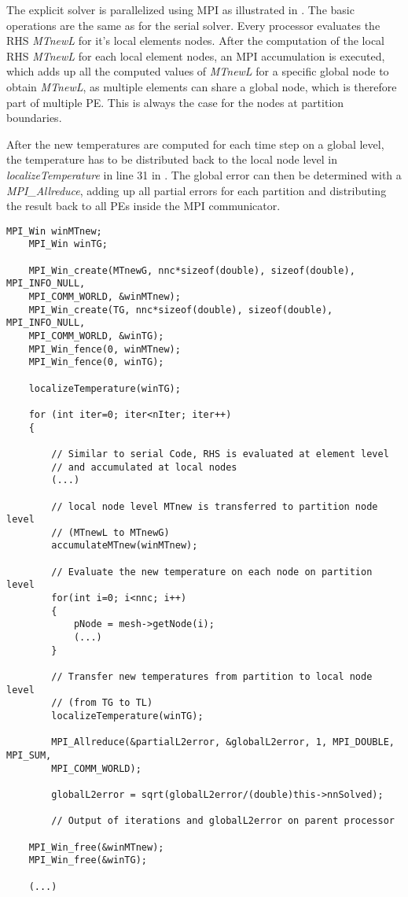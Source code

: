 The explicit solver is parallelized using MPI as illustrated in . The basic operations are the same as for the serial solver. Every processor evaluates the RHS \textit{MTnewL} for it's local elements nodes. After the computation of the local RHS \textit{MTnewL} for each local element nodes, an MPI accumulation is executed, which adds up all the computed values of \textit{MTnewL} for a specific global node to obtain \textit{MTnewL}, as multiple elements can share a global node, which is therefore part of multiple PE. This is always the case for the nodes at partition boundaries.

After the new temperatures are computed for each time step on a global level, the temperature has to be distributed back to the local node level in \textit{localizeTemperature} in line 31 in . The global error can then be determined with a \textit{MPI\_Allreduce}, adding up all partial errors for each partition and distributing the result back to all PEs inside the MPI communicator. 

\begin{lstlisting}[caption={\label{Code:MPI3} Explicit solver for MPI parallelization}]
	MPI_Win winMTnew;
	MPI_Win winTG;
	
	MPI_Win_create(MTnewG, nnc*sizeof(double), sizeof(double), MPI_INFO_NULL, 
	MPI_COMM_WORLD, &winMTnew);
	MPI_Win_create(TG, nnc*sizeof(double), sizeof(double), MPI_INFO_NULL, 
	MPI_COMM_WORLD, &winTG);
	MPI_Win_fence(0, winMTnew);
	MPI_Win_fence(0, winTG);
	
	localizeTemperature(winTG);
	
	for (int iter=0; iter<nIter; iter++)
	{
		
		// Similar to serial Code, RHS is evaluated at element level
		// and accumulated at local nodes
		(...)
		 
		// local node level MTnew is transferred to partition node level 
		// (MTnewL to MTnewG)
		accumulateMTnew(winMTnew);
		
		// Evaluate the new temperature on each node on partition level
		for(int i=0; i<nnc; i++)
		{
			pNode = mesh->getNode(i);
			(...)
		}
		
		// Transfer new temperatures from partition to local node level 
		// (from TG to TL)
		localizeTemperature(winTG);
		
		MPI_Allreduce(&partialL2error, &globalL2error, 1, MPI_DOUBLE, MPI_SUM, 
		MPI_COMM_WORLD);
		
		globalL2error = sqrt(globalL2error/(double)this->nnSolved);
		
		// Output of iterations and globalL2error on parent processor
	
	MPI_Win_free(&winMTnew);
	MPI_Win_free(&winTG);
	
	(...)
\end{lstlisting}


